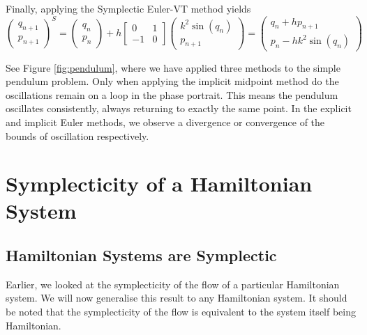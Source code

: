 \documentclass{report}
\theoremstyle{exampstyle} \newtheorem{example}[theorem]{Example}
\theoremstyle{exampstyle} \newtheorem{remark}[theorem]{Remark}
\theoremstyle{exampstyle} \newtheorem{definition}[theorem]{Definition}
\theoremstyle{exampstyle} \newtheorem{lemma}[theorem]{Lemma}
\begin{document}
Finally, applying the Symplectic Euler-VT method yields
\begin{equation}
	\begin{pmatrix}
		q_{n+1} \\
		p_{n+1}
	\end{pmatrix}^S = \begin{pmatrix}
		q_n \\
		p_n
	\end{pmatrix} + h \begin{bmatrix}
		0 & 1 \\
		-1 & 0
	\end{bmatrix} \begin{pmatrix}
		k^2 \sin(q_n) \\
		p_{n+1}
	\end{pmatrix} = \begin{pmatrix}
		q_n + h p_{n+1} \\
		p_n - h k^2 \sin(q_n)
	\end{pmatrix}
\end{equation}

See Figure \ref{fig:pendulum}, where we have applied three methods to the simple pendulum problem.
Only when applying the implicit midpoint method do the oscillations remain on a loop in the phase portrait.
This means the pendulum oscillates consistently, always returning to exactly the same point.
In the explicit and implicit Euler methods, we observe a divergence or convergence of the bounds of oscillation respectively.

\section{Symplecticity of a Hamiltonian System}

\subsection{Hamiltonian Systems are Symplectic}

Earlier, we looked at the symplecticity of the flow of a particular Hamiltonian system.
We will now generalise this result to any Hamiltonian system.
It should be noted that the symplecticity of the flow is equivalent to the system itself being Hamiltonian.
\end{document}
